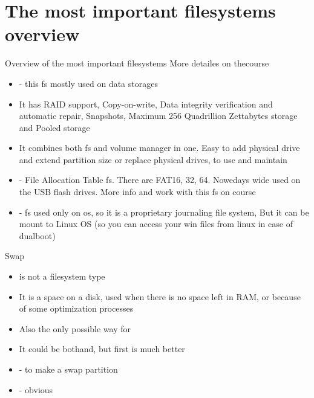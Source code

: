 \documentclass[usenames,dvipsnames,10pt,aspectratio=169]{beamer}
\begin{document}
\section{The most important filesystems overview}
\begin{frame}{Overview of the most important filesystems}
    More detailes on thecourse
    \begin{itemize}
        \item {} - this fs mostly used on data storages
        \item It has RAID support, Copy-on-write, Data integrity verification and automatic repair, Snapshots, Maximum 256 Quadrillion Zettabytes storage and Pooled storage
        \item It combines both fs and volume manager in one. Easy to add physical drive and extend partition size or replace physical drives, to use and maintain
        \item {} - File Allocation Table fs. There are FAT16, 32, 64. Nowedays wide used on the USB flash drives. More info and work with this fs on  course
        \item {} - fs used only on  os, so it is a proprietary journaling file system, But it can be mount to Linux OS (so you can access your win files from linux in case of dualboot)
    \end{itemize}
\end{frame}

\begin{frame}{Swap}
    \begin{itemize}
        \item {} is not a filesystem type
        \item It is a space on a disk, used when there is no space left in RAM, or because of some optimization processes
        \item Also the only possible way for
        \item It could be bothand, but first is much better
        \item {} - to make a swap partition
        \item {} - obvious
    \end{itemize}
\end{frame}
\end{document}
